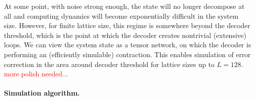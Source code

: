 \documentclass[aps, prl, letterpaper, twocolumn, superscriptaddress, notitlepage, 10pt]{revtex4-1}
\newcommand{\cggb}[1]{\textcolor{blue}{#1}}
\newcommand{\dude}[1]{\textcolor{red}{#1}}
\begin{document}
At some point, with noise strong enough, the state will
no longer decompose at all and computing dynamics will
become exponentially difficult in the system size.
However, for finite lattice size, this regime is somewhere
beyond the decoder threshold, which is the 
point at which the decoder creates nontrivial (extensive) loops.
We can view the system state as a tensor network, on which
the decoder is performing an (efficiently simulable) contraction.
This enables simulation of error correction in
the area around decoder threshold for lattice sizes up to $L=128.$
\dude{more polish needed...}


\paragraph{Simulation algorithm.}


\end{document}
